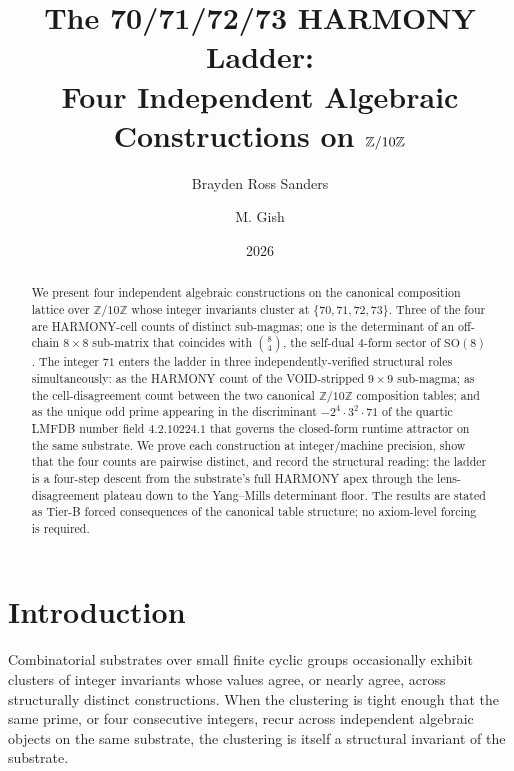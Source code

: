 \documentclass[11pt,reqno]{amsart}
\title[The 70/71/72/73 HARMONY Ladder]
  {The 70/71/72/73 HARMONY Ladder:\\
   Four Independent Algebraic Constructions on $\Z/10\Z$}
\author{Brayden Ross Sanders}
\author{M. Gish}
\date{2026}
\theoremstyle{definition}
\newcommand{\Z}{\mathbb{Z}}
\begin{document}
\begin{abstract}
We present four independent algebraic constructions on the canonical
composition lattice over $\Z/10\Z$ whose integer invariants cluster at
$\{70, 71, 72, 73\}$. Three of the four are HARMONY-cell counts of
distinct sub-magmas; one is the determinant of an off-chain
$8 \times 8$ sub-matrix that coincides with $\binom{8}{4}$, the
self-dual $4$-form sector of $\mathrm{SO}(8)$. The integer $71$ enters
the ladder in three independently-verified structural roles
simultaneously: as the HARMONY count of the VOID-stripped
$9 \times 9$ sub-magma; as the cell-disagreement count between the
two canonical $\Z/10\Z$ composition tables; and as the unique odd prime
appearing in the discriminant $-2^4 \cdot 3^2 \cdot 71$ of the quartic
LMFDB number field $4.2.10224.1$ that governs the closed-form runtime
attractor on the same substrate. We prove each construction at
integer/machine precision, show that the four counts are pairwise
distinct, and record the structural reading: the ladder is a
four-step descent from the substrate's full HARMONY apex through the
lens-disagreement plateau down to the Yang--Mills determinant floor.
The results are stated as Tier-B forced consequences of the canonical
table structure; no axiom-level forcing is required.
\end{abstract}

\maketitle

\section{Introduction}
\label{sec:intro}

Combinatorial substrates over small finite cyclic groups occasionally
exhibit clusters of integer invariants whose values agree, or nearly
agree, across structurally distinct constructions. When the
clustering is tight enough that the same prime, or four consecutive
integers, recur across independent algebraic objects on the same
substrate, the clustering is itself a structural invariant of the
substrate.
\end{document}
